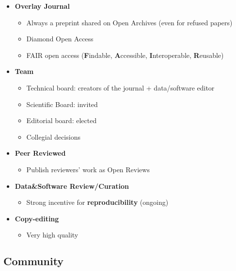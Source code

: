 \documentclass[10pt,compress,serif,aspectratio=169]{beamer}
\newcommand{\fig}[2]{\centering{\texttt{[image: \#2]}}}
\begin{document}
\begin{frame}[t]
  \fig{.6}{logo2023}
  \begin{itemize}
  \pause
  \item \textbf{Overlay Journal}
   \begin{itemize}
   \item Always a preprint shared on Open Archives (even for refused papers)
   \item Diamond Open Access
   \item FAIR open access (\textbf{F}indable, \textbf{A}ccessible, \textbf{I}nteroperable, \textbf{R}eusable)
   \end{itemize}
   \pause
 \item \textbf{Team}
   \begin{itemize}
   \item Technical board: creators of the journal + data/software editor
   \item Scientific Board: invited
   \item Editorial board: elected
   \item Collegial decisions
   \end{itemize}
   \pause  
 \item\textbf{Peer Reviewed}
   \begin{itemize}
   \item Publish reviewers' work as Open Reviews
   \end{itemize}
   \pause
 \item\textbf{Data\&Software Review/Curation}
   \begin{itemize}
   \item Strong incentive for \textbf{reproducibility} (ongoing)
   \end{itemize}
   \pause
 \item \textbf{Copy-editing}
   \begin{itemize}
   \item Very high quality
   \end{itemize}
 \end{itemize}
\end{frame}




\subsection{Community}
\end{document}
